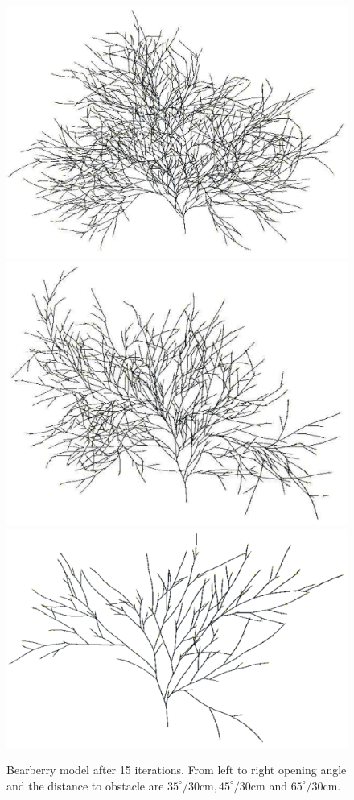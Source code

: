\begin{figure}
\includegraphics[scale=0.15]{auvaursi-sandpit-15-35d-30cm}
\includegraphics[scale=0.15]{auvaursi-sandpit-15-45d-30cm}
\includegraphics[scale=0.15]{auvaursi-sandpit-15-65d-30cm}    
\caption{Bearberry model after 15 iterations. From left to right 
  opening angle and the distance to obstacle are $35^{\circ}/30\mathrm{cm}, 
 45^{\circ}/30\mathrm{cm}$ and $65^{\circ}/30\mathrm{cm}$.}\label{fig:a-uva-ursi} 
\end{figure}
